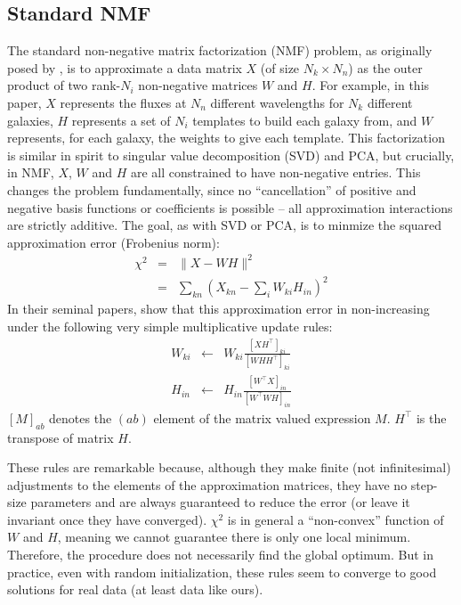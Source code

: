 \documentclass[12pt,preprint]{aastex}
\newcommand{\T}{^{\scriptscriptstyle \top}}
\newcommand{\XX}{X}
\newcommand{\XXh}{\hat{X}}
\newcommand{\Xkn}{X_{kn}}
\newcommand{\WW}{W}
\newcommand{\Wki}{W_{ki}}
\newcommand{\HH}{H}
\newcommand{\Hin}{H_{in}}
\begin{document}
\subsection{Standard NMF}
The standard non-negative matrix factorization (NMF) problem, as
originally posed by \cite{lee00a}, is to approximate a data matrix
$\XX$ (of size $N_k\times N_n$) as the outer product of two rank-$N_i$
non-negative matrices $\WW$ and $\HH$. For example, in this paper,
$\XX$ represents the fluxes at $N_n$ different wavelengths for $N_k$
different galaxies, $\HH$ represents a set of $N_i$ templates to build
each galaxy from, and $\WW$ represents, for each galaxy, the weights
to give each template. This factorization is similar in spirit to
singular value decomposition (SVD) and PCA, but crucially, in NMF,
$\XX$, $\WW$ and $\HH$ are all constrained to have non-negative
entries. This changes the problem fundamentally, since no
``cancellation'' of positive and negative basis functions or
coefficients is possible -- all approximation interactions are
strictly additive. The goal, as with SVD or PCA, is to minmize the
squared approximation error (Frobenius norm): 
\begin{eqnarray}
\label{eq:nmfcost}
\chi^2 &=& \|\XX-\WW\HH\|^2\\
&=& \sum_{kn} \left(\Xkn - \sum_i \Wki\Hin \right)^2
\end{eqnarray}
In their seminal papers, \cite{lee00a} show that this approximation
error in non-increasing under the following very simple multiplicative
update rules: 
\begin{eqnarray}
 \label{eq:wupdate}
\Wki &\leftarrow& \Wki \frac{[\XX\HH\T]_{ki}}{[\WW\HH\HH\T]_{ki}}\\
\label{eq:hupdate}
\Hin &\leftarrow& \Hin \frac{[\WW\T\XX]_{in}}{[\WW\T\WW\HH]_{in}}
\end{eqnarray}
$[M]_{ab}$ denotes the $(ab)$ element of the matrix valued expression
$M$. $\HH\T$ is the transpose of matrix $\HH$.

These rules are remarkable because, although they make finite (not
infinitesimal) adjustments to the elements of the approximation
matrices, they have no step-size parameters and are always guaranteed
to reduce the error (or leave it invariant once they have converged).
$\chi^2$ is in general a ``non-convex'' function of $\WW$ and $\HH$,
meaning we cannot guarantee there is only one local
minimum. Therefore, the procedure does not necessarily find the global
optimum. But in practice, even with random initialization, these rules
seem to converge to good solutions for real data (at least data like
ours).
\end{document}
